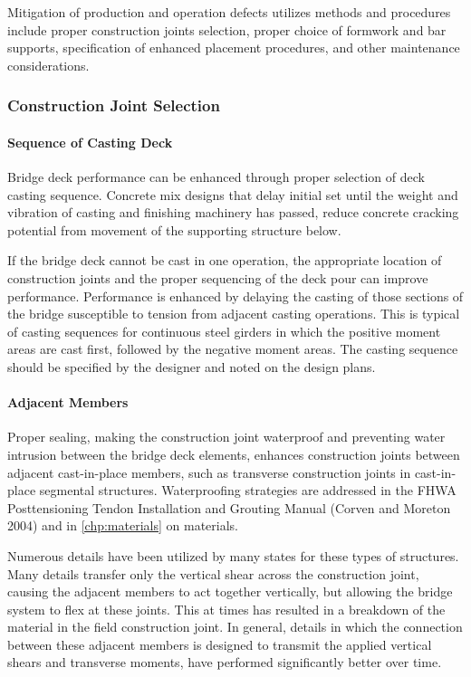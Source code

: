 Mitigation of production and operation defects utilizes methods and procedures include proper construction
joints selection, proper choice of formwork and bar supports, specification of enhanced placement procedures, and
other maintenance considerations.

\subsubsection{Construction Joint Selection}
\paragraph{Sequence of Casting Deck}
Bridge deck performance can be enhanced through proper selection of deck casting sequence. Concrete mix
designs that delay initial set until the weight and vibration of casting and finishing machinery has passed, reduce
concrete cracking potential from movement of the supporting structure below.

If the bridge deck cannot be cast in one operation, the appropriate location of construction joints and the proper
sequencing of the deck pour can improve performance. Performance is enhanced by delaying the casting of those
sections of the bridge susceptible to tension from adjacent casting operations. This is typical of casting sequences for
continuous steel girders in which the positive moment areas are cast first, followed by the negative moment areas.
The casting sequence should be specified by the designer and noted on the design plans.

\paragraph{Adjacent Members}
Proper sealing, making the construction joint waterproof and preventing water intrusion between the bridge deck
elements, enhances construction joints between adjacent cast-in-place members, such as transverse construction
joints in cast-in-place segmental structures. Waterproofing strategies are addressed in the FHWA Posttensioning
Tendon Installation and Grouting Manual (Corven and Moreton 2004) and in \cref{chp:materials} on materials.

Numerous details have been utilized by many states for these types of structures. Many details transfer only the
vertical shear across the construction joint, causing the adjacent members to act together vertically, but allowing the
bridge system to flex at these joints. This at times has resulted in a breakdown of the material in the field construction
joint. In general, details in which the connection between these adjacent members is designed to transmit the applied
vertical shears and transverse moments, have performed significantly better over time.


